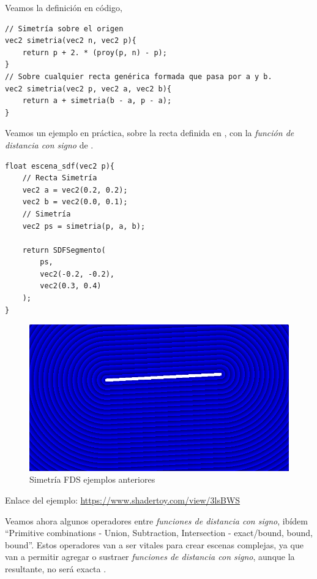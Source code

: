 \newpage
Veamos la definición en código,
\begin{lstlisting}
// Simetría sobre el origen
vec2 simetria(vec2 n, vec2 p){
    return p + 2. * (proy(p, n) - p);
}
// Sobre cualquier recta genérica formada que pasa por a y b.
vec2 simetria(vec2 p, vec2 a, vec2 b){
    return a + simetria(b - a, p - a);
}
\end{lstlisting}
Veamos un ejemplo en práctica, sobre la recta definida en , con la \textit{función de distancia con signo} de .
\begin{lstlisting}
float escena_sdf(vec2 p){
    // Recta Simetría
    vec2 a = vec2(0.2, 0.2);
    vec2 b = vec2(0.0, 0.1);
    // Simetría
    vec2 ps = simetria(p, a, b);
    
    return SDFSegmento(
        ps,
        vec2(-0.2, -0.2), 
        vec2(0.3, 0.4)
    );
}
\end{lstlisting}

\begin{figure}[H]
  \centering
  \captionsetup{justification=centering}%
  \includegraphics[width=1.0\textwidth]{secciones/imagenes/sdf/2d/sdf_simetria.png}
  \caption{Simetría FDS ejemplos anteriores}
  \label{fig:simetria}
\end{figure}

Enlace del ejemplo:
\url{https://www.shadertoy.com/view/3lsBWS}

Veamos ahora algunos operadores entre \textit{funciones de distancia con signo}, ibídem \enquote{Primitive combinations - Union, Subtraction, Intersection - exact/bound, bound, bound}. Estos operadores van a ser vitales para crear escenas complejas, ya que van a permitir agregar o sustraer \textit{funciones de distancia con signo}, aunque la resultante, no será exacta \cite{interiorinigo}.

